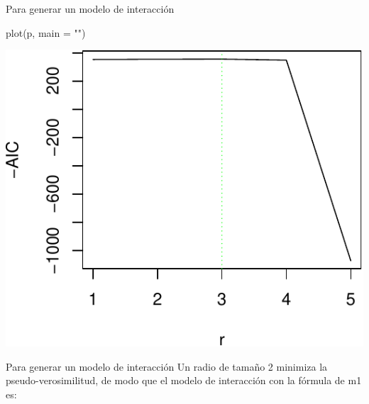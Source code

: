 \documentclass[
  11pt,
  ignorenonframetext,
]{beamer}
\newenvironment{Shaded}{}{}
\newcommand{\AttributeTok}[1]{\textcolor[rgb]{0.49,0.56,0.16}{#1}}
\newcommand{\CommentTok}[1]{\textcolor[rgb]{0.38,0.63,0.69}{\textit{#1}}}
\newcommand{\DecValTok}[1]{\textcolor[rgb]{0.25,0.63,0.44}{#1}}
\newcommand{\FloatTok}[1]{\textcolor[rgb]{0.25,0.63,0.44}{#1}}
\newcommand{\FunctionTok}[1]{\textcolor[rgb]{0.02,0.16,0.49}{#1}}
\newcommand{\NormalTok}[1]{#1}
\newcommand{\OtherTok}[1]{\textcolor[rgb]{0.00,0.44,0.13}{#1}}
\newcommand{\SpecialCharTok}[1]{\textcolor[rgb]{0.25,0.44,0.63}{#1}}
\newcommand{\StringTok}[1]{\textcolor[rgb]{0.25,0.44,0.63}{#1}}
\begin{document}
\begin{frame}[fragile]{Para generar un modelo de interacción}
\protect\hypertarget{para-generar-un-modelo-de-interacciuxf3n-1}{}
\begin{Shaded}
\begin{Highlighting}[]
\FunctionTok{plot}\NormalTok{(p, }\AttributeTok{main =} \StringTok{""}\NormalTok{)}
\end{Highlighting}
\end{Shaded}

\begin{center}\includegraphics{Tutorial-spatstat-2_files/figure-beamer/unnamed-chunk-28-1} \end{center}
\end{frame}

\begin{frame}[fragile]{Para generar un modelo de interacción}
\protect\hypertarget{para-generar-un-modelo-de-interacciuxf3n-2}{}
Un radio de tamaño 2 minimiza la pseudo-verosimilitud, de modo que el
modelo de interacción con la fórmula de m1 es:

\begin{Shaded}
\end{Shaded}
\end{frame}
\end{document}
